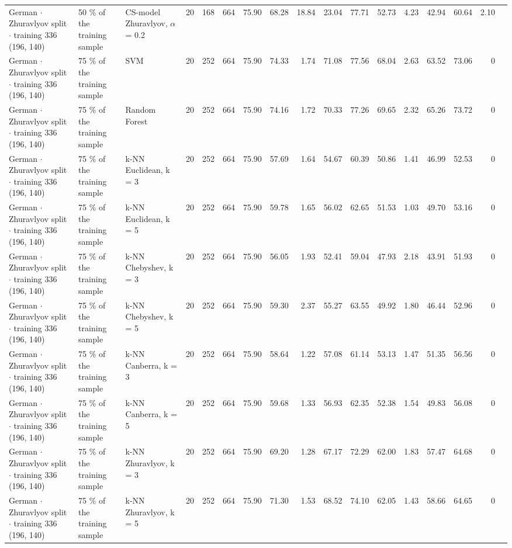 \begin{longtable}{lllrrrrrrrrrrrrrl}
  German $\cdot$ Zhuravlyov split $\cdot$ training 336 (196, 140) & 50 \% of the training sample & CS-model Zhuravlyov, $\alpha$ = 0.2 & 20 & 168 & 664 & 75.90 & 68.28 & 18.84 & 23.04 & 77.71 & 52.73 & 4.23 & 42.94 & 60.64 & 2.10 &  \\
  German $\cdot$ Zhuravlyov split $\cdot$ training 336 (196, 140) & 75 \% of the training sample & SVM & 20 & 252 & 664 & 75.90 & 74.33 & 1.74 & 71.08 & 77.56 & 68.04 & 2.63 & 63.52 & 73.06 & 0 &  \\
  German $\cdot$ Zhuravlyov split $\cdot$ training 336 (196, 140) & 75 \% of the training sample & Random Forest & 20 & 252 & 664 & 75.90 & 74.16 & 1.72 & 70.33 & 77.26 & 69.65 & 2.32 & 65.26 & 73.72 & 0 &  \\
  German $\cdot$ Zhuravlyov split $\cdot$ training 336 (196, 140) & 75 \% of the training sample & k-NN Euclidean, k = 3 & 20 & 252 & 664 & 75.90 & 57.69 & 1.64 & 54.67 & 60.39 & 50.86 & 1.41 & 46.99 & 52.53 & 0 &  \\
  German $\cdot$ Zhuravlyov split $\cdot$ training 336 (196, 140) & 75 \% of the training sample & k-NN Euclidean, k = 5 & 20 & 252 & 664 & 75.90 & 59.78 & 1.65 & 56.02 & 62.65 & 51.53 & 1.03 & 49.70 & 53.16 & 0 &  \\
  German $\cdot$ Zhuravlyov split $\cdot$ training 336 (196, 140) & 75 \% of the training sample & k-NN Chebyshev, k = 3 & 20 & 252 & 664 & 75.90 & 56.05 & 1.93 & 52.41 & 59.04 & 47.93 & 2.18 & 43.91 & 51.93 & 0 &  \\
  German $\cdot$ Zhuravlyov split $\cdot$ training 336 (196, 140) & 75 \% of the training sample & k-NN Chebyshev, k = 5 & 20 & 252 & 664 & 75.90 & 59.30 & 2.37 & 55.27 & 63.55 & 49.92 & 1.80 & 46.44 & 52.96 & 0 &  \\
  German $\cdot$ Zhuravlyov split $\cdot$ training 336 (196, 140) & 75 \% of the training sample & k-NN Canberra, k = 3 & 20 & 252 & 664 & 75.90 & 58.64 & 1.22 & 57.08 & 61.14 & 53.13 & 1.47 & 51.35 & 56.56 & 0 &  \\
  German $\cdot$ Zhuravlyov split $\cdot$ training 336 (196, 140) & 75 \% of the training sample & k-NN Canberra, k = 5 & 20 & 252 & 664 & 75.90 & 59.68 & 1.33 & 56.93 & 62.35 & 52.38 & 1.54 & 49.83 & 56.08 & 0 &  \\
  German $\cdot$ Zhuravlyov split $\cdot$ training 336 (196, 140) & 75 \% of the training sample & k-NN Zhuravlyov, k = 3 & 20 & 252 & 664 & 75.90 & 69.20 & 1.28 & 67.17 & 72.29 & 62.00 & 1.83 & 57.47 & 64.68 & 0 &  \\
  German $\cdot$ Zhuravlyov split $\cdot$ training 336 (196, 140) & 75 \% of the training sample & k-NN Zhuravlyov, k = 5 & 20 & 252 & 664 & 75.90 & 71.30 & 1.53 & 68.52 & 74.10 & 62.05 & 1.43 & 58.66 & 64.65 & 0 &  \\

\end{longtable}
